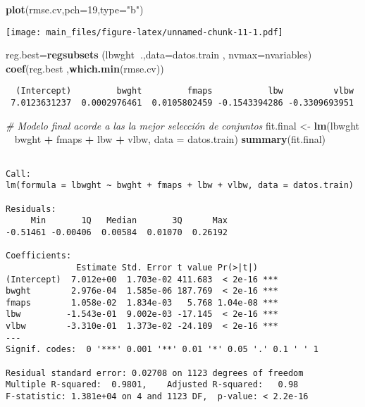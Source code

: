 \documentclass[]{article}
\newenvironment{Shaded}{\begin{snugshade}}{\end{snugshade}}
\newcommand{\KeywordTok}[1]{\textcolor[rgb]{0.13,0.29,0.53}{\textbf{#1}}}
\newcommand{\DataTypeTok}[1]{\textcolor[rgb]{0.13,0.29,0.53}{#1}}
\newcommand{\DecValTok}[1]{\textcolor[rgb]{0.00,0.00,0.81}{#1}}
\newcommand{\StringTok}[1]{\textcolor[rgb]{0.31,0.60,0.02}{#1}}
\newcommand{\CommentTok}[1]{\textcolor[rgb]{0.56,0.35,0.01}{\textit{#1}}}
\newcommand{\OperatorTok}[1]{\textcolor[rgb]{0.81,0.36,0.00}{\textbf{#1}}}
\newcommand{\NormalTok}[1]{#1}
\begin{document}
\begin{Shaded}
\begin{Highlighting}[]
\KeywordTok{plot}\NormalTok{(rmse.cv,}\DataTypeTok{pch=}\DecValTok{19}\NormalTok{,}\DataTypeTok{type=}\StringTok{"b"}\NormalTok{)}
\end{Highlighting}
\end{Shaded}

\texttt{[image: main\_files/figure-latex/unnamed-chunk-11-1.pdf]}

\begin{Shaded}
\begin{Highlighting}[]
\NormalTok{reg.best=}\KeywordTok{regsubsets}\NormalTok{ (lbwght}\OperatorTok{~}\NormalTok{.,}\DataTypeTok{data=}\NormalTok{datos.train , }\DataTypeTok{nvmax=}\NormalTok{nvariables)}
\KeywordTok{coef}\NormalTok{(reg.best ,}\KeywordTok{which.min}\NormalTok{(rmse.cv))}
\end{Highlighting}
\end{Shaded}

\begin{verbatim}
  (Intercept)         bwght         fmaps           lbw          vlbw 
 7.0123631237  0.0002976461  0.0105802459 -0.1543394286 -0.3309693951 
\end{verbatim}

\begin{Shaded}
\begin{Highlighting}[]
\CommentTok{# Modelo final acorde a las la mejor selección de conjuntos}
\NormalTok{fit.final <-}\StringTok{ }\KeywordTok{lm}\NormalTok{(lbwght }\OperatorTok{~}\StringTok{ }\NormalTok{bwght }\OperatorTok{+}\StringTok{ }\NormalTok{fmaps }\OperatorTok{+}\StringTok{ }\NormalTok{lbw }\OperatorTok{+}\StringTok{ }\NormalTok{vlbw, }\DataTypeTok{data =}\NormalTok{ datos.train)}
\KeywordTok{summary}\NormalTok{(fit.final)}
\end{Highlighting}
\end{Shaded}

\begin{verbatim}

Call:
lm(formula = lbwght ~ bwght + fmaps + lbw + vlbw, data = datos.train)

Residuals:
     Min       1Q   Median       3Q      Max 
-0.51461 -0.00406  0.00584  0.01070  0.26192 

Coefficients:
              Estimate Std. Error t value Pr(>|t|)    
(Intercept)  7.012e+00  1.703e-02 411.683  < 2e-16 ***
bwght        2.976e-04  1.585e-06 187.769  < 2e-16 ***
fmaps        1.058e-02  1.834e-03   5.768 1.04e-08 ***
lbw         -1.543e-01  9.002e-03 -17.145  < 2e-16 ***
vlbw        -3.310e-01  1.373e-02 -24.109  < 2e-16 ***
---
Signif. codes:  0 '***' 0.001 '**' 0.01 '*' 0.05 '.' 0.1 ' ' 1

Residual standard error: 0.02708 on 1123 degrees of freedom
Multiple R-squared:  0.9801,    Adjusted R-squared:   0.98 
F-statistic: 1.381e+04 on 4 and 1123 DF,  p-value: < 2.2e-16
\end{verbatim}
\end{document}
